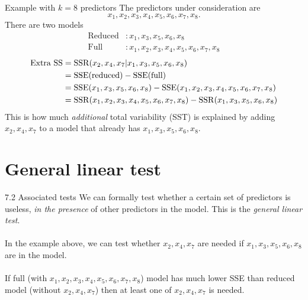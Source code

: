 \documentclass{beamer}
\begin{document}
\begin{frame}{Example with $k=8$ predictors}
The predictors under consideration are
$$
x_1, x_2, x_3, x_4, x_5, x_6, x_7, x_8.
$$
\pause There are two models
\begin{align*}
\text{Reduced} &: x_1, x_3, x_5, x_6, x_8\\
\text{Full} &: x_1, x_2, x_3, x_4, x_5, x_6, x_7, x_8
\end{align*}
\vspace{-10pt}
\pause \begin{align*}
\text{Extra SS} &= {\rm SSR}(x_2, x_4, x_7|x_1, x_3, x_5, x_6, x_8)\\
& = {\rm SSE}(\text{reduced})-{\rm SSE}(\text{full})\\
& = {\rm SSE}(x_1, x_3, x_5, x_6, x_8) - {\rm SSE}(x_1, x_2, x_3, x_4, x_5, x_6, x_7, x_8)\\
& = {\rm SSR}(x_1, x_2, x_3, x_4, x_5, x_6, x_7, x_8) - {\rm SSR}(x_1, x_3, x_5, x_6, x_8)
\end{align*}
\pause This is how much \textit{additional} total variability (SST) is explained by adding $x_2, x_4, x_7$ to a model that already has $x_1, x_3, x_5, x_6, x_8$.
\end{frame}

\section{General linear test}

\begin{frame}{7.2 Associated tests}
We can formally test whether a certain set of predictors is useless,
\textit{in the presence} of other predictors in the model. \pause This is the \textit{general linear test}.\\~\\

\pause In the example above, we can test whether $x_2, x_4, x_7$ are needed if
$x_1, x_3, x_5, x_6, x_8$ are in the model.\\~\\
\pause If full (with
$x_1, x_2, x_3, x_4, x_5, x_6, x_7, x_8$) model has much lower SSE than reduced
model (without $x_2, x_4, x_7$) then at least one of $x_2, x_4, x_7$ is needed.
\end{frame}
\end{document}
